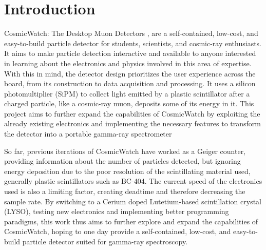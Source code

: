 \chapter{Introduction}

CosmicWatch: The Desktop Muon Detectors \cite{axani2019physics}, are a self-contained, low-cost, and easy-to-build particle detector for students, scientists, and cosmic-ray enthusiasts. It aims to make particle detection interactive and available to anyone interested in learning about the electronics and physics involved in this area of expertise. With this in mind, the detector design prioritizes the user experience across the board, from its construction to data acquisition and processing. It uses a silicon photomultiplier (SiPM) to collect light emitted by a plastic scintillator after a charged particle, like a cosmic-ray muon, deposits some of its energy in it. This project aims to further expand the capabilities of CosmicWatch by exploiting the already existing electronics and implementing the necessary features to transform the detector into a portable gamma-ray spectrometer

So far, previous iterations of CosmicWatch have worked as a Geiger counter, providing information about the number of particles detected, but ignoring energy deposition due to the poor resolution of the scintillating material used, generally plastic scintillators such as BC-404. The current speed of the electronics used is also a limiting factor, creating deadtime and therefore decreasing the sample rate. By switching to a Cerium doped Lutetium-based scintillation crystal (LYSO), testing new electronics and implementing better programming paradigms, this work thus aims to further explore and expand the capabilities of CosmicWatch, hoping to one day provide a self-contained, low-cost, and easy-to-build particle detector suited for gamma-ray spectroscopy.